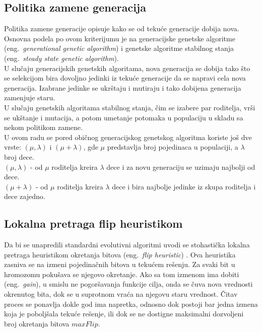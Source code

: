 \documentclass{article}
\begin{document}
\subsection{Politika zamene generacija}
 \label{sec:ea_zamena}
Politika zamene generacije \cite{vi_Janicic, ea_without_table} opisuje kako se od tekuće generacije dobija nova. Osnovna podela po ovom kriterijumu je na generacijske genetske algoritme (eng.~{\em generational genetic algorithm}) i genetske algoritme stabilnog stanja (eng.~{\em steady state genetic algorithm}). \\
 
U slučaju generacijskih genetskih algoritama, nova generacija se dobija tako što se selekcijom bira dovoljno jedinki iz tekuće generacije da se napravi cela nova generacija. Izabrane jedinke se ukrštaju i mutiraju i tako dobijena generacija zamenjuje staru. \\
 
U slučaju genetskih algoritama stabilnog stanja, čim se izabere par roditelja, vrši se ukštanje i mutacija, a potom umetanje potomaka u populaciju u skladu sa nekom politikom zamene. \\
 
U ovom radu se pored običnog generacijskog genetskog algoritma koriste još dve vrste: $(\mu, \lambda) $ i $(\mu + \lambda)$, gde $\mu$ predstavlja broj pojedinaca u populaciji, a $\lambda$ broj dece. \\
 
$(\mu, \lambda)$ - od $\mu$ roditelja kreira $\lambda$ dece i za novu generaciju se uzimaju  najbolji od dece.\\
 
$(\mu + \lambda)$ - od $\mu$ roditelja kreira $\lambda$ dece i bira najbolje jedinke iz skupa roditelja i dece zajedno.


\subsection{Lokalna pretraga flip heuristikom}
\label{sec:lokalna_pretraga_flip}
Da bi se unapredili standardni evolutivni algoritmi uvodi se stohastička lokalna pretraga
heuristikom okretanja bitova (eng.~{\em flip heuristic}) \cite{MaRos99_flipGA}.
Ova heuristika zasniva se na izmeni pojedinačnih bitova u tekućem rešenju. 
Za svaki bit u hromozomu pokušava se njegovo okretanje. Ako sa tom izmenom ima dobiti 
(eng.~{\em gain}), u smislu ne pogoršavanja funkcije cilja, 
onda se čuva nova vrednosti okrenutog bita, 
dok se u suprotnom vraća na njegovu staru vrednost. 
Čitav proces se ponavlja dokle god ima napretka, odnosno dok postoji bar jedna izmena
koja je poboljšala tekuće rešenje, ili dok se ne dostigne maksimalni dozvoljeni broj
okretanja bitova $maxFlip$.\\
\end{document}
